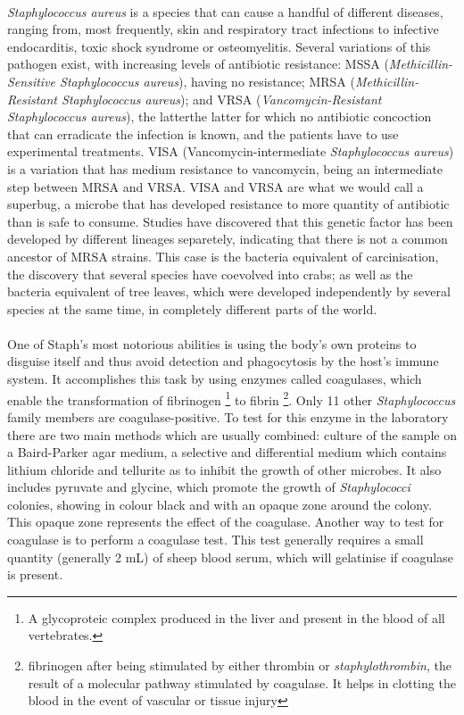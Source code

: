 \paragraph{}\emph{Staphylococcus aureus} is a species that can cause a handful of different diseases, ranging from, most frequently, skin and respiratory tract infections to infective endocarditis, toxic shock syndrome or osteomyelitis. Several variations of this pathogen exist, with increasing levels of antibiotic resistance: MSSA (\emph{Methicillin-Sensitive Staphylococcus aureus}), having no resistance; MRSA (\emph{Methicillin-Resistant Staphylococcus aureus}); and VRSA (\emph{Vancomycin-Resistant \emph{Staphylococcus aureus}}), the latterthe latter for which no antibiotic concoction that can erradicate the infection is known, and the patients have to use experimental treatments. VISA (Vancomycin-intermediate \emph{Staphylococcus aureus}) is a variation that has medium resistance to vancomycin, being an intermediate step between MRSA and VRSA. VISA and VRSA are what we would call a superbug, a microbe that has developed resistance to more quantity of antibiotic than is safe to consume. Studies have discovered that this genetic factor has been developed by different lineages separetely, indicating that there is not a common ancestor of MRSA strains. This case is the bacteria equivalent of carcinisation, the discovery that several species have coevolved into crabs; as well as the bacteria equivalent of tree leaves, which were developed independently by several species at the same time, in completely different parts of the world. 
\paragraph{}One of Staph's most notorious abilities is using the body's own proteins to disguise itself and thus avoid detection and phagocytosis by the host's immune system. It accomplishes this task by using enzymes called coagulases, which enable the transformation of fibrinogen \footnote{A glycoproteic complex produced in the liver and present in the blood of all vertebrates.} to fibrin \footnote{fibrinogen after being stimulated by either thrombin or \emph{staphylothrombin}, the result of a molecular pathway stimulated by coagulase. It helps in clotting the blood in the event of vascular or tissue injury}\cite{murrayMicrobiologiaMedica2013}. Only 11 other \emph{Staphylococcus} family members are coagulase-positive. To test for this enzyme in the laboratory there are two main methods which are usually combined: culture of the sample on a Baird-Parker agar medium, a selective and differential medium which contains lithium chloride and tellurite as to inhibit the growth of other microbes. It also includes pyruvate and glycine, which promote the growth of \emph{Staphylococci} colonies, showing in colour black and with an opaque zone around the colony. This opaque zone represents the effect of the coagulase. Another way to test for coagulase is to perform a coagulase test. This test generally requires a small quantity (generally 2 mL) of sheep blood serum, which will gelatinise if coagulase is present.
